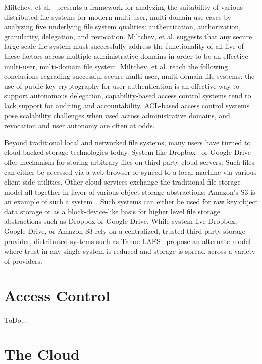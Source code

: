 Miltchev, et al.~\cite{Miltchev2008} presents a framework for
analyzing the suitability of various distributed file systems for
modern multi-user, multi-domain use cases by analyzing five underlying
file system qualities: authentication, authorization, granularity,
delegation, and revocation. Miltchev, et al. suggests that any secure
large scale file system must successfully address the functionality of
all five of these factors across multiple administrative domains in
order to be an effective multi-user, multi-domain file
system. Miltchev, et al. reach the following conclusions regrading
successful secure multi-user, multi-domain file systems: the use of
public-key cryptography for user authentication is an effective way to
support autonomous delegation, capability-based access control systems
tend to lack support for auditing and accountability, ACL-based access
control systems pose scalability challenges when used across
administrative domains, and revocation and user autonomy are often at
odds.

Beyond traditional local and networked file systems, many users have
turned to cloud-backed storage technologies today. System like
Dropbox~\cite{dropbox} or Google Drive~\cite{google-drive} offer
mechanism for storing arbitrary files on third-party cloud
servers. Such files can either be accessed via a web browser or synced
to a local machine via various client-side utilities. Other cloud
services exchange the traditional file storage model all together in
favor of various object storage abstractions: Amazon's S3 is an
example of such a system~\cite{amazon-s3}. Such systems can either be
used for raw key:object data storage or as a block-device-like basis
for higher level file storage abstractions such as Dropbox or Google
Drive. While system live Dropbox, Google Drive, or Amazon S3 rely on a
centralized, trusted third party storage provider, distributed systems
such as Tahoe-LAFS~\cite{Wilcox-O'Hearn2008} propose an alternate
model where trust in any single system is reduced and storage is
spread across a variety of providers.

\section{Access Control}

ToDo...

\section{The Cloud}

